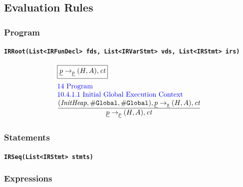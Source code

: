 \documentclass[a4paper, leqno]{amsart}
\newcommand{\stmt}{s}
\newcommand{\ir}[1]{\ensuremath{\underline{#1}}}
\newcommand{\mtt}[1]{\mbox{\tt\footnotesize #1}}
\def\inblue{\color{blue}}
\newcommand{\undef}{{\tt undefined}}
\newcommand{\true}{{\tt true}}
\renewcommand{\lg}{{\tt \#Global}}
\newcommand{\ct}{\emph{ct}}
\newcommand{\res}{\ensuremath{(H,A)}}
\def\inblue{\color{blue}}
\begin{document}


\newpage
\subsection{Evaluation Rules}

\subsubsection{Program}
\paragraph{\mtt{IRRoot(List<IRFunDecl> fds, List<IRVarStmt> vds, List<IRStmt> irs)}}

\[
\begin{array}{l@{~~}l@{~~}ll}
\fbox{$\ir{p} \rightarrow_{\ir{p}} \res,\ct$}\\[1em]
\mbox{\inblue 14 Program}\\
\mbox{\inblue 10.4.1.1 Initial Global Execution Context}\\
\frac{\begin{matrix}
(\emph{InitHeap}, \lg, \lg), \ir{p} \rightarrow_{\ir{\stmt}} \res,\ct
\end{matrix}}{\begin{matrix}
\ir{p} \rightarrow_{\ir{p}} \res,\ct
\end{matrix}}
\\[1em]
\end{array}
\]

\subsubsection{Statements}
\paragraph{\mtt{IRSeq(List<IRStmt> stmts)}}

\subsubsection{Expressions}
\end{document}
